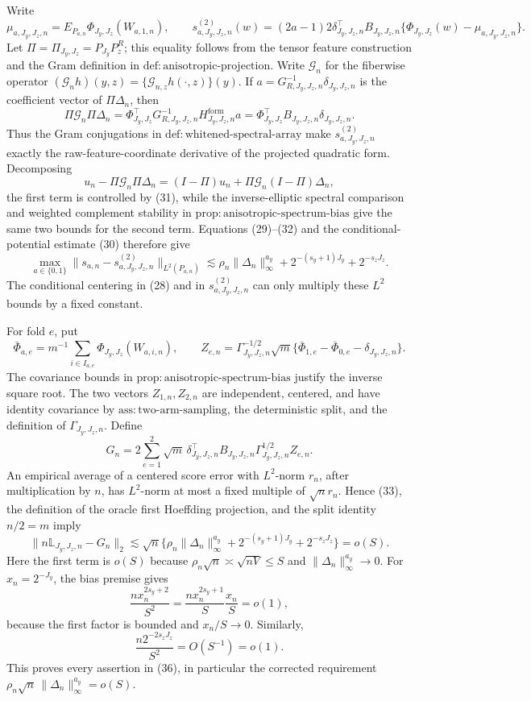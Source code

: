 Write
\[
\mu_{a,J_y,J_z,n}=E_{P_{a,n}}\Phi_{J_y,J_z}(W_{a,1,n}),
\qquad
s^{(2)}_{a,J_y,J_z,n}(w)
=(2a-1)2\delta_{J_y,J_z,n}^{\top}B_{J_y,J_z,n}
\{\Phi_{J_y,J_z}(w)-\mu_{a,J_y,J_z,n}\}.
\]
Let \(\Pi=\Pi_{J_y,J_z}=P_{J_y}P_z^R\); this equality follows from the tensor feature construction and the Gram definition in \(\mathrm{def{:}anisotropic\text{-}projection}\).  Write \(\mathcal G_n\) for the fiberwise operator \((\mathcal G_nh)(y,z)=\{\mathcal G_{n,z}h(\cdot,z)\}(y)\).  If \(a=G_{R,J_y,J_z,n}^{-1}\delta_{J_y,J_z,n}\) is the coefficient vector of \(\Pi\Delta_n\), then
\[
\Pi\mathcal G_n\Pi\Delta_n
=\Phi_{J_y,J_z}^{\top}G_{R,J_y,J_z,n}^{-1}
H^{\mathrm{form}}_{J_y,J_z,n}a
=\Phi_{J_y,J_z}^{\top}B_{J_y,J_z,n}\delta_{J_y,J_z,n}.
\tag{32}
\]
Thus the Gram conjugations in \(\mathrm{def{:}whitened\text{-}spectral\text{-}array}\) make \(s^{(2)}_{a,J_y,J_z,n}\) exactly the raw-feature-coordinate derivative of the projected quadratic form.  Decomposing
\[
u_n-\Pi\mathcal G_n\Pi\Delta_n
=(I-\Pi)u_n+\Pi\mathcal G_n(I-\Pi)\Delta_n,
\]
the first term is controlled by (31), while the inverse-elliptic spectral comparison and weighted complement stability in \(\mathrm{prop{:}anisotropic\text{-}spectrum\text{-}bias}\) give the same two bounds for the second term.  Equations (29)--(32) and the conditional-potential estimate (30) therefore give
\[
\max_{a\in\{0,1\}}
\|s_{a,n}-s^{(2)}_{a,J_y,J_z,n}\|_{L^2(P_{a,n})}
\lesssim
\rho_n\|\Delta_n\|_\infty^{a_y}
+2^{-(s_y+1)J_y}+2^{-s_zJ_z}.
\tag{33}
\]
The conditional centering in (28) and in \(s^{(2)}_{a,J_y,J_z,n}\) can only multiply these \(L^2\) bounds by a fixed constant.

For fold \(e\), put
\[
\bar\Phi_{a,e}=m^{-1}\sum_{i\in I_{a,e}}\Phi_{J_y,J_z}(W_{a,i,n}),
\qquad
Z_{e,n}=\Gamma_{J_y,J_z,n}^{-1/2}\sqrt m
\{\bar\Phi_{1,e}-\bar\Phi_{0,e}-\delta_{J_y,J_z,n}\}.
\tag{34}
\]
The covariance bounds in \(\mathrm{prop{:}anisotropic\text{-}spectrum\text{-}bias}\) justify the inverse square root.  The two vectors \(Z_{1,n},Z_{2,n}\) are independent, centered, and have identity covariance by \(\mathrm{ass{:}two\text{-}arm\text{-}sampling}\), the deterministic split, and the definition of \(\Gamma_{J_y,J_z,n}\).  Define
\[
G_n=2\sum_{e=1}^2\sqrt m\,
\delta_{J_y,J_z,n}^{\top}B_{J_y,J_z,n}
\Gamma_{J_y,J_z,n}^{1/2}Z_{e,n}.
\tag{35}
\]
An empirical average of a centered score error with \(L^2\)-norm \(r_n\), after multiplication by \(n\), has \(L^2\)-norm at most a fixed multiple of \(\sqrt n r_n\).  Hence (33), the definition of the oracle first Hoeffding projection, and the split identity \(n/2=m\) imply
\[
\|n\mathbb L_{J_y,J_z,n}-G_n\|_2
\lesssim\sqrt n\{\rho_n\|\Delta_n\|_\infty^{a_y}
+2^{-(s_y+1)J_y}+2^{-s_zJ_z}\}=o(S).
\tag{36}
\]
Here the first term is \(o(S)\) because \(\rho_n\sqrt n\asymp\sqrt{nV}\le S\) and \(\|\Delta_n\|_\infty^{a_y}\to0\).  For \(x_n=2^{-J_y}\), the bias premise gives
\[
\frac{n x_n^{2s_y+2}}{S^2}
=\frac{n x_n^{2s_y+1}}{S}\frac{x_n}{S}=o(1),
\]
because the first factor is bounded and \(x_n/S\to0\).  Similarly,
\[
\frac{n2^{-2s_zJ_z}}{S^2}=O(S^{-1})=o(1).
\]
This proves every assertion in (36), in particular the corrected requirement
\(\rho_n\sqrt n\,\|\Delta_n\|_\infty^{a_y}=o(S)\).

